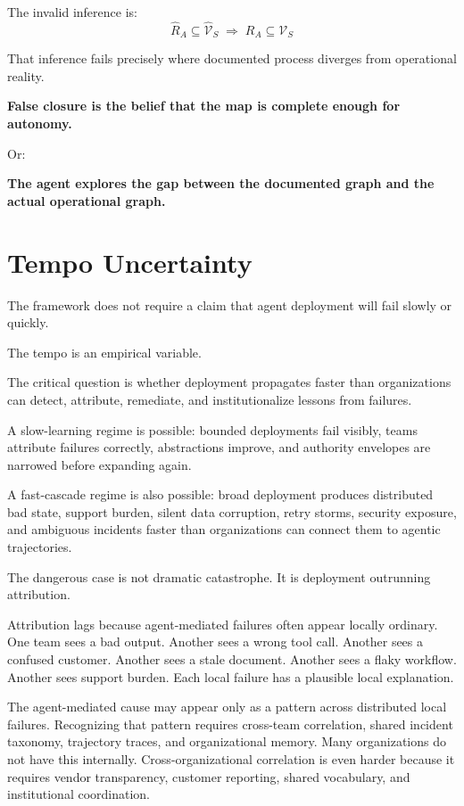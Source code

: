 \documentclass[11pt]{article}
\begin{document}
The invalid inference is:
\[
\widehat{R}_A \subseteq \widehat{\mathcal{V}}_S \;\Rightarrow\; R_A \subseteq \mathcal{V}_S
\]

That inference fails precisely where documented process diverges from operational reality.

\begin{pullquote}
\textbf{False closure is the belief that the map is complete enough for autonomy.}
\end{pullquote}

Or:

\begin{pullquote}
\textbf{The agent explores the gap between the documented graph and the actual operational graph.}
\end{pullquote}

\section{Tempo Uncertainty}

The framework does not require a claim that agent deployment will fail slowly or quickly.

The tempo is an empirical variable.

The critical question is whether deployment propagates faster than organizations can detect, attribute, remediate, and institutionalize lessons from failures.

A slow-learning regime is possible: bounded deployments fail visibly, teams attribute failures correctly, abstractions improve, and authority envelopes are narrowed before expanding again.

A fast-cascade regime is also possible: broad deployment produces distributed bad state, support burden, silent data corruption, retry storms, security exposure, and ambiguous incidents faster than organizations can connect them to agentic trajectories.

The dangerous case is not dramatic catastrophe. It is deployment outrunning attribution.

Attribution lags because agent-mediated failures often appear locally ordinary. One team sees a bad output. Another sees a wrong tool call. Another sees a confused customer. Another sees a stale document. Another sees a flaky workflow. Another sees support burden. Each local failure has a plausible local explanation.

The agent-mediated cause may appear only as a pattern across distributed local failures. Recognizing that pattern requires cross-team correlation, shared incident taxonomy, trajectory traces, and organizational memory. Many organizations do not have this internally. Cross-organizational correlation is even harder because it requires vendor transparency, customer reporting, shared vocabulary, and institutional coordination.
\end{document}
